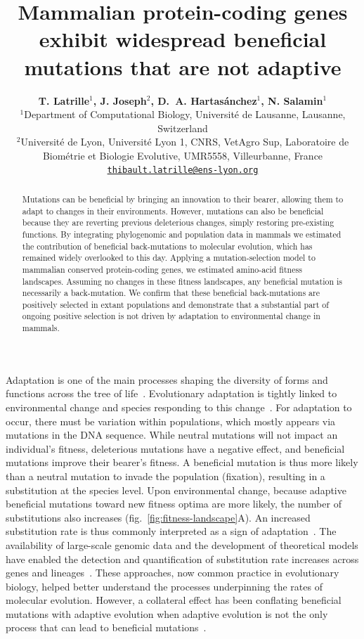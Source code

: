\documentclass{article}
\title{Mammalian protein-coding genes exhibit widespread beneficial mutations that are not adaptive}
\author{
    \large
    \textbf{T. {Latrille}$^{1}$, J. {Joseph}$^{2}$, D.~A. {Hartasánchez}$^{1}$, N. {Salamin}$^{1}$}\\
    \normalsize
    $^{1}$Department of Computational Biology, Université de Lausanne, Lausanne, Switzerland\\
    $^{2}$Université de Lyon, Université Lyon 1, CNRS, VetAgro Sup, Laboratoire de Biométrie et Biologie Evolutive, UMR5558, Villeurbanne, France \\
    \texttt{\href{mailto:thibault.latrille@ens-lyon.org}{thibault.latrille@ens-lyon.org}} \\
}
\begin{document}
    \maketitle

    \begin{abstract}
        Mutations can be beneficial by bringing an innovation to their bearer, allowing them to adapt to changes in their environments. However, mutations can also be beneficial because they are reverting previous deleterious changes, simply restoring pre-existing functions. By integrating phylogenomic and population data in mammals we estimated the contribution of beneficial back-mutations to molecular evolution, which has remained widely overlooked to this day. Applying a mutation-selection model to mammalian conserved protein-coding genes, we estimated amino-acid fitness landscapes. Assuming no changes in these fitness landscapes, any beneficial mutation is necessarily a back-mutation. We confirm that these beneficial back-mutations are positively selected in extant populations and demonstrate that a substantial part of ongoing positive selection is not driven by adaptation to environmental change in mammals.
    \end{abstract}


    Adaptation is one of the main processes shaping the diversity of forms and functions across the tree of life~\cite{darwin_origin_1859}.
    Evolutionary adaptation is tightly linked to environmental change and species responding to this change~\cite{merrell_adaptive_1994, gavrilets_adaptive_2009}.
    For adaptation to occur, there must be variation within populations, which mostly appears via mutations in the DNA sequence.
    While neutral mutations will not impact an individual's fitness, deleterious mutations have a negative effect, and beneficial mutations improve their bearer's fitness.
    A beneficial mutation is thus more likely than a neutral mutation to invade the population (fixation), resulting in a substitution at the species level.
    Upon environmental change, because adaptive beneficial mutations toward new fitness optima are more likely, the number of substitutions also increases (fig.~\ref{fig:fitness-landscape}A).
    An increased substitution rate is thus commonly interpreted as a sign of adaptation~\cite{mcdonald_adaptative_1991, smith_adaptive_2002, welch_estimating_2006}.
    The availability of large-scale genomic data and the development of theoretical models have enabled the detection and quantification of substitution rate increases across genes and lineages~\cite{yang_statistical_2000, eyre-walker_genomic_2006, moutinho_variation_2019}.
    These approaches, now common  practice in evolutionary biology, helped better understand the processes underpinning the rates of molecular evolution.
    However, a collateral effect has been conflating beneficial mutations with adaptive evolution when adaptive evolution is not the only process that can lead to beneficial mutations~\cite{charlesworth_other_2007, mustonen_fitness_2009}.
\end{document}
